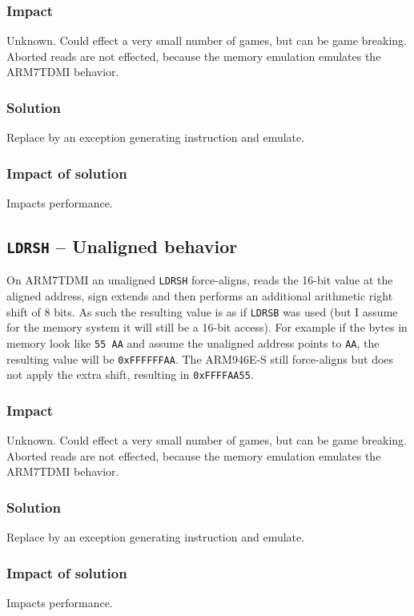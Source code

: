 \documentclass[a4paper,10pt]{report}
\begin{document}
	\subsubsection{Impact}
	Unknown. Could effect a very small number of games, but can be game breaking. Aborted reads are not effected, because the memory emulation emulates the ARM7TDMI behavior.
	
	\subsubsection{Solution}
	Replace by an exception generating instruction and emulate.
	
	\subsubsection{Impact of solution}
	Impacts performance.
	
	\subsection{\texttt{LDRSH} \--- Unaligned behavior}
	On ARM7TDMI an unaligned \texttt{LDRSH} force-aligns, reads the 16-bit value at the aligned address, sign extends and then performs an additional arithmetic right shift of 8 bits. As such the resulting value is as if \texttt{LDRSB} was used (but I assume for the memory system it will still be a 16-bit access). For example if the bytes in memory look like \texttt{55 AA} and assume the unaligned address points to \texttt{AA}, the resulting value will be \texttt{0xFFFFFFAA}. The ARM946E-S still force-aligns but does not apply the extra shift, resulting in \texttt{0xFFFFAA55}.
	
	\subsubsection{Impact}
	Unknown. Could effect a very small number of games, but can be game breaking. Aborted reads are not effected, because the memory emulation emulates the ARM7TDMI behavior.
	
	\subsubsection{Solution}
	Replace by an exception generating instruction and emulate.
	
	\subsubsection{Impact of solution}
	Impacts performance.
	
\end{document}
